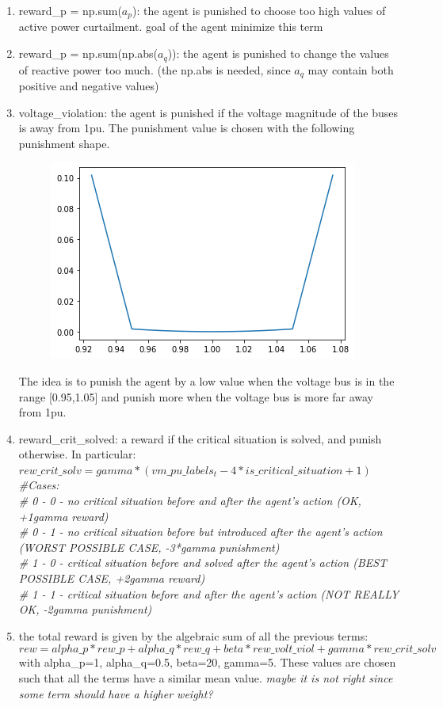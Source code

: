 \begin{enumerate}
    \item reward\_p = np.sum($a_p$): the agent is punished to choose too high values of active power curtailment. goal of the agent minimize this term
    \item reward\_p = np.sum(np.abs($a_q$)): the agent is punished to change the values of reactive power too much. (the np.abs is needed, since $a_q$ may contain both positive and negative values)
    \newpage
    \item voltage\_violation: the agent is punished if the voltage magnitude of the buses is away from 1pu. The punishment value is chosen with the following punishment shape.
    \begin{figure}[h]
    \centering
        \includegraphics[width=.4\linewidth]{images/RL/volatge_violation_function.png}
    \end{figure}
    The idea is to punish the agent by a low value when the voltage bus is in the range [0.95,1.05] and punish more when the voltage bus is more far away from 1pu.
    \item reward\_crit\_solved: a reward if the critical situation is solved, and punish otherwise. In particular:\\
    
    \emph{
    $rew\_crit\_solv = gamma * (vm\_pu\_labels_t - 4 * is\_critical\_situation + 1)$\\
    #Cases:\\
    # 0 - 0 - no critical situation before and after the agent's action (OK, +1gamma reward)\\
    # 0 - 1 - no critical situation before but introduced after the agent's action (WORST POSSIBLE CASE, -3*gamma punishment)\\
    # 1 - 0 - critical situation before and solved after the agent's action (BEST POSSIBLE CASE, +2gamma reward)\\
    # 1 - 1 - critical situation before and after the agent's action (NOT REALLY OK, -2gamma punishment)\\
    }
    \item the total reward is given by the algebraic sum of all the previous terms:
    \[
    rew = alpha\_p * rew\_p + alpha\_q * rew\_q +  beta * rew\_volt\_viol + gamma * rew\_crit\_solv
    \]
    with alpha\_p=1, alpha\_q=0.5, beta=20, gamma=5. These values are chosen such that all the terms have a similar mean value. \emph{maybe it is not right since some term should have a higher weight?}
\end{enumerate}\\


